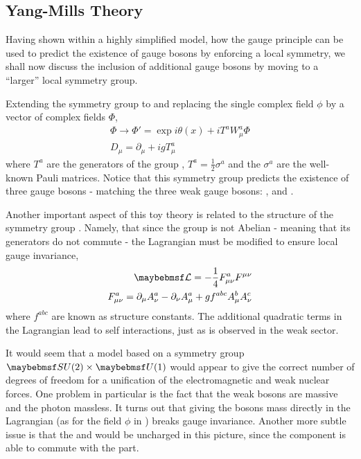 \subsection{Yang-Mills Theory}
Having shown within a highly simplified model, how the gauge principle can be
used to predict the existence of gauge bosons by enforcing a local symmetry, we
shall now discuss the inclusion of additional gauge bosons by moving to a
``larger'' local symmetry group.

Extending the symmetry group to \SUtwo and replacing the single complex field
$\phi$ by a vector of complex fields $\Phi$,
\begin{eqnarray*}
\Phi \longrightarrow \Phi' = \exp{i\theta(x) + iT^a W^a_{\mu}}\Phi\\
D_{\mu} = \partial_{\mu} + igT^a_{\mu}
\end{eqnarray*}
where $T^a$ are the generators of the group \SUtwo, $T^a = \frac{1}{2}\sigma^a$
and the $\sigma^a$ are the well-known Pauli matrices. Notice that this symmetry
group predicts the existence of three gauge bosons - matching the three weak
gauge bosons: \PZ, \PWp and \PWm.

Another important aspect of this toy theory is related to the structure of the
symmetry group \SUtwo. Namely, that since the group is not Abelian - meaning
that its generators do not commute - the Lagrangian must be modified to ensure
local gauge invariance,
\begin{eqnarray*}
\lagrangiand = -\frac{1}{4}F^a_{\mu\nu}F^{\mu\nu} \\
F^a_{\mu\nu} = \partial_{\mu} A^a_{\nu} - \partial_{\nu} A^a_{\mu} + g f^{abc}
A^b_{\mu} A^c_{\nu}
\end{eqnarray*}
where $f^{abc}$ are known as structure constants. The additional quadratic terms
in the Lagrangian lead to self interactions, just as is observed in the weak
sector.

It would seem that a model based on a symmetry group $\SUtwo\times\Uone$ would
appear to give the correct number of degrees of freedom for a unification of the
electromagnetic and weak nuclear forces. One problem in particular is the fact
that the weak bosons are massive and the photon massless. It turns out that
giving the bosons mass directly in the Lagrangian (as for the field $\phi$
in \label{eqn:scalar_qed}) breaks gauge invariance. Another more subtle issue is
that the \PWp and \PWm would be uncharged in this picture, since the \SUtwo
component is able to commute with the \Uone part.

